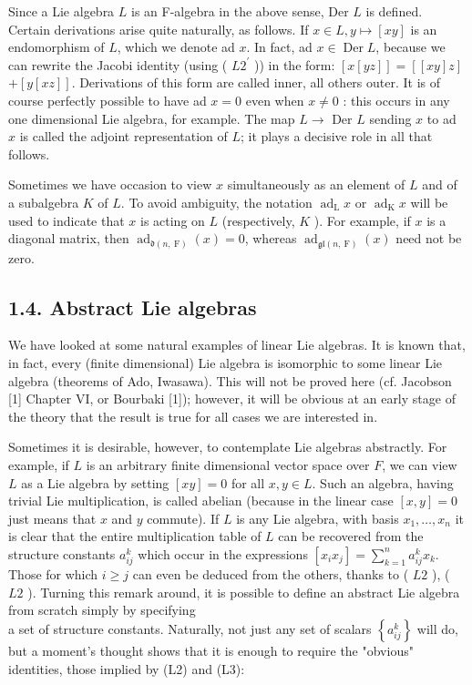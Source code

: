 \documentclass[10pt]{article}
\begin{document}
Since a Lie algebra $L$ is an F-algebra in the above sense, Der $L$ is defined. Certain derivations arise quite naturally, as follows. If $x \in L, y \mapsto[x y]$ is an endomorphism of $L$, which we denote ad $x$. In fact, ad $x \in \operatorname{Der} L$, because we can rewrite the Jacobi identity (using ( $L 2^{\prime}$ )) in the form: $[x[y z]]=[[x y] z]$ $+[y[x z]]$. Derivations of this form are called inner, all others outer. It is of course perfectly possible to have ad $x=0$ even when $x \neq 0$ : this occurs in any one dimensional Lie algebra, for example. The map $L \rightarrow$ Der $L$ sending $x$ to ad $x$ is called the adjoint representation of $L$; it plays a decisive role in all that follows.

Sometimes we have occasion to view $x$ simultaneously as an element of $L$ and of a subalgebra $K$ of $L$. To avoid ambiguity, the notation $\operatorname{ad}_{\mathrm{L}} x$ or $\operatorname{ad}_{\mathrm{K}} x$ will be used to indicate that $x$ is acting on $L$ (respectively, $K$ ). For example, if $x$ is a diagonal matrix, then $\operatorname{ad}_{\mathfrak{d}(n, \mathrm{~F})}(x)=0$, whereas $\operatorname{ad}_{\mathfrak{g l}(n, \mathrm{~F})}(x)$ need not be zero.

\subsection*{1.4. Abstract Lie algebras}
We have looked at some natural examples of linear Lie algebras. It is known that, in fact, every (finite dimensional) Lie algebra is isomorphic to some linear Lie algebra (theorems of Ado, Iwasawa). This will not be proved here (cf. Jacobson [1] Chapter VI, or Bourbaki [1]); however, it will be obvious at an early stage of the theory that the result is true for all cases we are interested in.

Sometimes it is desirable, however, to contemplate Lie algebras abstractly. For example, if $L$ is an arbitrary finite dimensional vector space over $F$, we can view $L$ as a Lie algebra by setting $[x y]=0$ for all $x, y \in L$. Such an algebra, having trivial Lie multiplication, is called abelian (because in the linear case $[x, y]=0$ just means that $x$ and $y$ commute). If $L$ is any Lie algebra, with basis $x_{1}, \ldots, x_{n}$ it is clear that the entire multiplication table of $L$ can be recovered from the structure constants $a_{i j}^{k}$ which occur in the expressions $\left[x_{i} x_{j}\right]=\sum_{k=1}^{n} a_{i j}^{k} x_{k}$. Those for which $i \geq j$ can even be deduced from the others, thanks to ( $L 2$ ), ( $L 2$ ). Turning this remark around, it is possible to define an abstract Lie algebra from scratch simply by specifying\\
a set of structure constants. Naturally, not just any set of scalars $\left\{a_{i j}^{k}\right\}$ will do, but a moment's thought shows that it is enough to require the "obvious" identities, those implied by (L2) and (L3):
\end{document}
